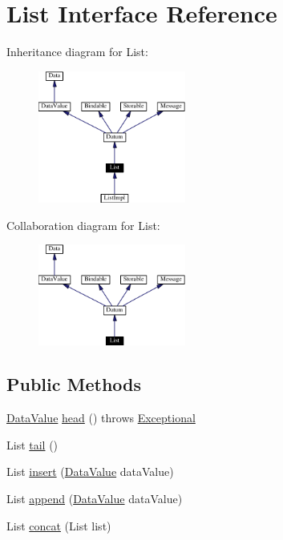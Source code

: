 \hypertarget{interfaceList}{
\section{List  Interface Reference}
\label{interfaceList}
}
Inheritance diagram for List:\begin{figure}[H]
\begin{center}
\leavevmode
\includegraphics[width=137pt]{interfaceList__inherit__graph}
\end{center}
\end{figure}
Collaboration diagram for List:\begin{figure}[H]
\begin{center}
\leavevmode
\includegraphics[width=137pt]{interfaceList__coll__graph}
\end{center}
\end{figure}
\subsection*{Public Methods}
\begin{CompactItemize}
\item 
\hyperlink{interfaceDataValue}{Data\-Value} \hyperlink{interfaceList_a0}{head} () throws \hyperlink{classExceptional}{Exceptional}
\item 
List \hyperlink{interfaceList_a1}{tail} ()
\item 
List \hyperlink{interfaceList_a2}{insert} (\hyperlink{interfaceDataValue}{Data\-Value} data\-Value)
\item 
List \hyperlink{interfaceList_a3}{append} (\hyperlink{interfaceDataValue}{Data\-Value} data\-Value)
\item 
List \hyperlink{interfaceList_a4}{concat} (List list)
\end{CompactItemize}


